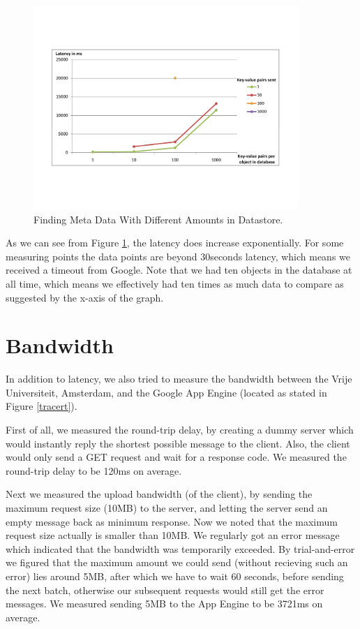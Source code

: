 \begin{figure} %
\begin{center}
\includegraphics[trim=5cm 4cm 5cm 5cm,width=10cm]{./figures/find_amt.pdf}
\caption{Finding Meta Data With Different Amounts in Datastore.
\label{find-md-amt}}
\end{center}
\end{figure}

As we can see from Figure \ref{find-md-amt}, the latency does increase
exponentially. For some measuring points the data points are beyond 30seconds
latency, which means we received a timeout from Google. Note that we had ten
objects in the database at all time, which means we effectively had ten times
as much data to compare as suggested by the x-axis of the graph.

\section{Bandwidth}
In addition to latency, we also tried to measure the bandwidth between the
Vrije Universiteit, Amsterdam, and the Google App Engine (located as stated in
Figure \ref{tracert}).

First of all, we measured the round-trip delay, by creating a dummy server
which would instantly reply the shortest possible message to the client. Also,
the client would only send a GET request and wait for a response code. We
measured the round-trip delay to be 120ms on average.

Next we measured the upload bandwidth (of the client), by sending the maximum
request size (10MB) to the server, and letting the server send an empty message
back as minimum response. Now we noted that the maximum request size actually
is smaller than 10MB. We regularly got an error message which indicated that
the bandwidth was temporarily exceeded. By trial-and-error we figured that the
maximum amount we could send (without recieving such an error) lies around
5MB, after which we have to wait 60 seconds, before sending the next batch,
otherwise our subsequent requests would still get the error messages. We
measured sending 5MB to the App Engine to be 3721ms on average.

